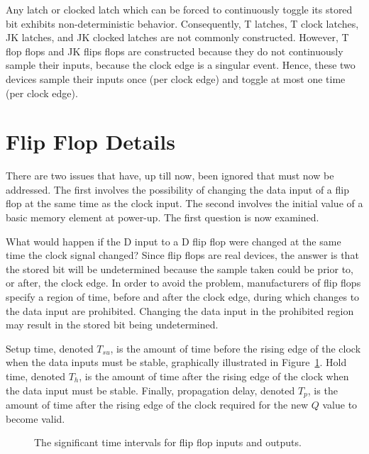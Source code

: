 Any latch or clocked latch which can be forced to continuously toggle 
its stored bit exhibits non-deterministic behavior.  Consequently,
T latches, T clock latches, JK latches, and JK clocked latches are
not commonly constructed.  However, T flop flops and JK flips flops
are constructed because they do not continuously sample their inputs,
because the clock edge is a singular event.  Hence, these two devices
sample their inputs once (per clock edge) and toggle at most
one time (per clock edge).

\section{Flip Flop Details}
There are two issues that have, up till now, been ignored
that must now be addressed.  The first involves
the possibility of changing the data input of a flip flop at the
same time as the clock input.  The second involves the initial
value of a basic memory element at power-up. The first question
is now examined.

What would happen if the D input to a D flip flop were changed at 
the same time the clock signal changed?  Since flip flops are
real devices, the answer is that the stored bit will be 
undetermined because the sample taken could be prior to, 
or after, the clock edge.  In order to avoid the problem,
manufacturers of flip flops specify a region of time, before and
after the clock edge, during which changes to the data input are
prohibited.  Changing the data input in the prohibited region
may result in the stored bit being undetermined.

Setup time,  \label{page:setup} denoted $T_{su}$, is the
amount of time before the rising edge of the clock when the data
inputs must be stable, graphically illustrated in 
Figure~\ref{fig:ff-time}.  Hold time,  denoted $T_h$, 
is the amount of time after the rising edge of the clock when the data
input must be stable.  Finally, propagation delay, denoted $T_p$,
  
is the amount of time after the rising edge of the clock required for the 
new $Q$ value to become valid. 

\begin{figure}[ht]
\caption{The significant time intervals for flip flop inputs and outputs.}
\label{fig:ff-time}
\end{figure}

